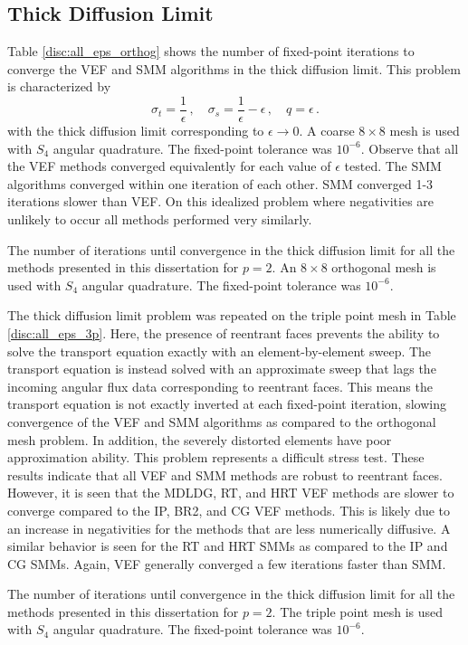 \documentclass[../doc.tex]{subfiles}
\begin{document}
\subsection{Thick Diffusion Limit}
Table \ref{disc:all_eps_orthog} shows the number of fixed-point iterations to converge the VEF and SMM algorithms in the thick diffusion limit. This problem is characterized by 
	\begin{equation}
		\sigma_t = \frac{1}{\epsilon} \,, \quad \sigma_s = \frac{1}{\epsilon} - \epsilon \,, \quad q = \epsilon \,. 
	\end{equation}
with the thick diffusion limit corresponding to $\epsilon \rightarrow 0$. A coarse $8\times 8$ mesh is used with $S_4$ angular quadrature. The fixed-point tolerance was $10^{-6}$. Observe that all the VEF methods converged equivalently for each value of $\epsilon$ tested. The SMM algorithms converged within one iteration of each other. SMM converged 1-3 iterations slower than VEF. On this idealized problem where negativities are unlikely to occur all methods performed very similarly. 
\begin{table}
\centering
\caption{The number of iterations until convergence in the thick diffusion limit for all the methods presented in this dissertation for $p=2$. An $8\times 8$ orthogonal mesh is used with $S_4$ angular quadrature. The fixed-point tolerance was $10^{-6}$.}
\label{disc:all_eps_orthog}

\end{table}

The thick diffusion limit problem was repeated on the triple point mesh in Table \ref{disc:all_eps_3p}. Here, the presence of reentrant faces prevents the ability to solve the transport equation exactly with an element-by-element sweep. The transport equation is instead solved with an approximate sweep that lags the incoming angular flux data corresponding to reentrant faces. This means the transport equation is not exactly inverted at each fixed-point iteration, slowing convergence of the VEF and SMM algorithms as compared to the orthogonal mesh problem. In addition, the severely distorted elements have poor approximation ability. This problem represents a difficult stress test. These results indicate that all VEF and SMM methods are robust to reentrant faces. However, it is seen that the MDLDG, RT, and HRT VEF methods are slower to converge compared to the IP, BR2, and CG VEF methods. This is likely due to an increase in negativities for the methods that are less numerically diffusive. A similar behavior is seen for the RT and HRT SMMs as compared to the IP and CG SMMs. Again, VEF generally converged a few iterations faster than SMM. 
\begin{table}
\centering
\caption{The number of iterations until convergence in the thick diffusion limit for all the methods presented in this dissertation for $p=2$. The triple point mesh is used with $S_4$ angular quadrature. The fixed-point tolerance was $10^{-6}$.}
\label{disc:all_eps_3p}

\end{table}
\end{document}
